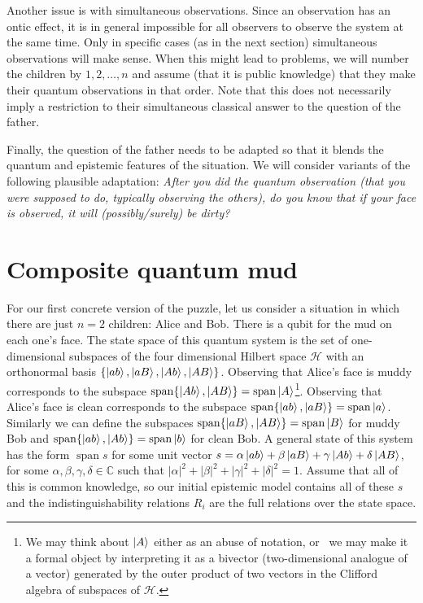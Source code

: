 \documentclass[a4paper]{article}
\newcommand{\HH}{\mathcal{H}}
\newcommand{\CC}{\mathbb{C}}
\DeclareMathOperator{\spn}{span}
\begin{document}
Another issue is with simultaneous observations. Since an observation has an
ontic effect, it is in general impossible for all observers to observe the
system at the same time. Only in specific cases (as in the next section)
simultaneous observations will make sense. When this might lead to problems, we
will number the children by $1, 2, \dots, n$ and assume (that it is public
knowledge) that they make their quantum observations in that order. Note that
this does not necessarily imply a restriction to their simultaneous classical
answer to the question of the father.

Finally, the question of the father needs to be adapted so that it blends the
quantum and epistemic features of the situation. We will consider variants of 
the following plausible adaptation:
\emph{After you did the quantum observation (that you were supposed to do,
    typically observing the others), do you know that if your face is observed,
it will (possibly/surely) be dirty?}

\section*{Composite quantum mud}
For our first concrete version of the puzzle, let us consider a situation in
which there are just $n = 2$ children: Alice and Bob. There is a qubit for the
mud on each one's face. The state space of this quantum system is the set of
one-dimensional subspaces of the four dimensional Hilbert space $\HH$ with an
orthonormal basis $\{\ket{ab}, \ket{aB}, \ket{Ab}, \ket{AB}\}$. Observing that
Alice's face is muddy corresponds to the subspace $\spn\{\ket{Ab},\ket{AB}\} =
\spn\ket{A}$\footnote{We may think about $\ket{A}$ either as an abuse of
notation, or~\cite{geomcs} we may make it a formal object by interpreting it as
a bivector (two-dimensional analogue of a vector) generated by the outer product
of two vectors in the Clifford algebra of subspaces of $\HH$.}.  Observing that
Alice's face is clean corresponds to the subspace $\spn\{\ket{ab},\ket{aB}\} =
\spn\ket{a}$. Similarly we can define the subspaces $\spn\{\ket{aB}, \ket{AB}\}
= \spn\ket{B}$ for muddy Bob and $\spn\{\ket{ab},\ket{Ab}\} = \spn\ket{b}$ for
clean Bob. A general state of this system has the form $\spn{s}$ for some unit
vector $s = \alpha\ket{ab} + \beta\ket{aB} + \gamma\ket{Ab} + \delta\ket{AB}$,
for some $\alpha, \beta, \gamma, \delta \in \CC$ such that $|\alpha|^2 +
|\beta|^2 + |\gamma|^2 + |\delta|^2 = 1$.  Assume that all of this is common
knowledge, so our initial epistemic model contains all of these $s$ and the
indistinguishability relations $R_i$ are the full relations over the state
space.
\end{document}
